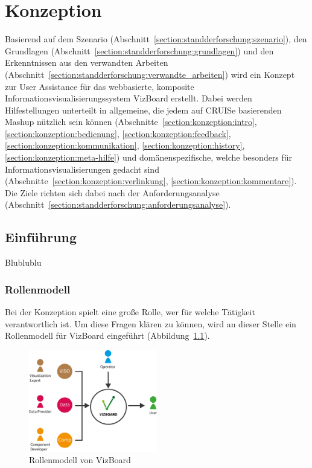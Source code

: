 \documentclass[
	headsepline,
	footsepline,
	fontsize=12pt,
	bibliography=totoc
]{scrbook}
\begin{document}
\chapter{Konzeption}
\label{chapter:konzeption}

Basierend auf dem Szenario (Abschnitt~\ref{section:standderforschung:szenario}), den Grundlagen (Abschnitt~\ref{section:standderforschung:grundlagen}) und den Erkenntnissen aus den verwandten Arbeiten (Abschnitt~\ref{section:standderforschung:verwandte_arbeiten}) wird ein Konzept zur User Assistance für das webbasierte, komposite Informationsvisualisierungssystem VizBoard erstellt. Dabei werden Hilfestellungen unterteilt in allgemeine, die jedem auf CRUISe basierenden Mashup nützlich sein können (Abschnitte~\ref{section:konzeption:intro}, \ref{section:konzeption:bedienung}, \ref{section:konzeption:feedback}, \ref{section:konzeption:kommunikation}, \ref{section:konzeption:history}, \ref{section:konzeption:meta-hilfe}) und domänenspezifische, welche besonders für Informationsvisualisierungen gedacht sind (Abschnitte~\ref{section:konzeption:verlinkung}, \ref{section:konzeption:kommentare}). Die Ziele richten sich dabei nach der Anforderungsanalyse (Abschnitt~\ref{section:standderforschung:anforderungsanalyse}).

\section{Einführung}
\label{section:konzeption:einfuehrung}

Blublublu\todo{:/}

\subsection{Rollenmodell}
\label{section:konzeption:einfuehrung:rollenmodell}

Bei der Konzeption spielt eine große Rolle, wer für welche Tätigkeit verantwortlich ist. Um diese Fragen klären zu können, wird an dieser Stelle ein Rollenmodell für VizBoard eingeführt (Abbildung~\ref{figure:rollenmodell}).

\begin{figure}[htbp]
   \centering
   \includegraphics[width=0.5\textwidth]{images/konzeption-rollenmodell.png}
   \caption{Rollenmodell von VizBoard}
   \label{figure:rollenmodell}
\end{figure}
\end{document}
